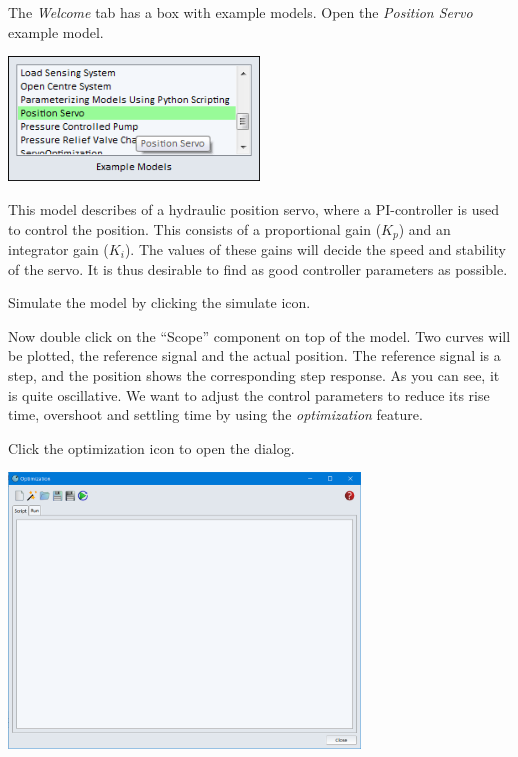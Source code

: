 \documentclass[a4paper,pdftex]{article}
\begin{document}
\begin{tutenumerate}
The \textit{Welcome} tab has a box with example models. Open the \textit{Position Servo} example model.

\begin{centering}
\includegraphics[width=0.5\textwidth]{gfx/optimization/openmodel.png}
\end{centering}

This model describes of a hydraulic position servo, where a PI-controller is used to control the position. This consists of a proportional gain ($K_{p}$) and an integrator gain ($K_{i}$).  The values of these gains will decide the speed and stability of the servo. It is thus desirable to find as good controller parameters as possible.

Simulate the model by clicking the simulate icon.
 

Now double click on the \enquote{Scope} component on top of the model. Two curves will be plotted, the reference signal and the actual position. The reference signal is a step, and the position shows the corresponding step response. As you can see, it is quite oscillative. We want to adjust the control parameters to reduce its rise time, overshoot and settling time by using the \textit{optimization} feature.

Click the optimization icon to open the dialog.



\begin{center}
\includegraphics[width=0.7\textwidth]{gfx/optimization/screenshot-opt0.png}
\end{center}


\end{tutenumerate}
\end{document}
